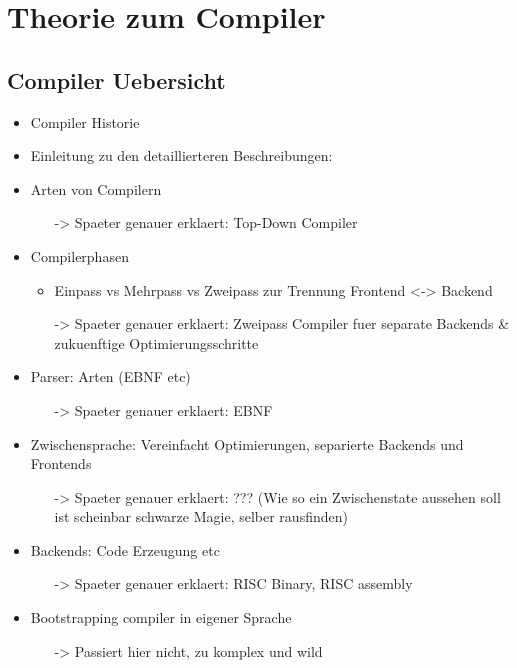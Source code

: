 \part{Theorie zum Compiler}
\chapter{Compiler Uebersicht}
\label{chapter}

\begin{itemize}
  \item Compiler Historie
  \item Einleitung zu den detaillierteren Beschreibungen:
  \item Arten von Compilern 
  \begin{itemize}
  \item[->] Spaeter genauer erklaert: Top-Down Compiler
  \end{itemize}
  \item Compilerphasen
  \begin{itemize}
    \item Einpass vs Mehrpass vs Zweipass zur Trennung Frontend <-> Backend
    \item[->] Spaeter genauer erklaert: Zweipass Compiler fuer separate Backends & zukuenftige Optimierungsschritte
  \end{itemize}
  \item Parser: Arten (EBNF etc)
  \begin{itemize}
  \item[->] Spaeter genauer erklaert: EBNF
  \end{itemize}
  \item Zwischensprache: Vereinfacht Optimierungen, separierte Backends und Frontends
  \begin{itemize}
    \item[->] Spaeter genauer erklaert: ??? (Wie so ein Zwischenstate aussehen soll ist scheinbar schwarze Magie, selber rausfinden)
  \end{itemize}
  \item Backends: Code Erzeugung etc
  \begin{itemize}
    \item[->] Spaeter genauer erklaert: RISC Binary, RISC assembly
  \end{itemize}
  \item Bootstrapping compiler in eigener Sprache
  \begin{itemize}
    \item[->] Passiert hier nicht, zu komplex und wild
  \end{itemize}
\end{itemize}
